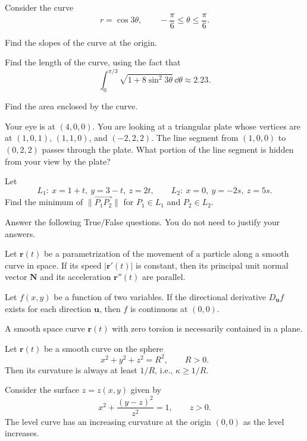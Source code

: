 \begin{problem}
Consider the curve
\[
r=\cos3\theta,
\qquad -\frac{\pi}{6}\le\theta\le\frac{\pi}{6}.
\]
\begin{problemsubparts}
\item Find the slopes of the curve at the origin.
\item Find the length of the curve, using the fact that
\[
\int_0^{\pi/3}\sqrt{1+8\sin^2 3\theta}\,\dd\theta\approx2.23.
\]
\item Find the area enclosed by the curve.
\end{problemsubparts}
\end{problem}

\begin{problem}
Your eye is at $(4,0,0)$. You are looking at a triangular plate whose vertices are at $(1,0,1)$, $(1,1,0)$, and $(-2,2,2)$. The line segment from $(1,0,0)$ to $(0,2,2)$ passes through the plate. What portion of the line segment is hidden from your view by the plate?
\end{problem}

\begin{problem}
Let
\[
L_1:\ x=1+t,\ y=3-t,\ z=2t,
\qquad
L_2:\ x=0,\ y=-2s,\ z=5s.
\]
Find the minimum of $\|\overrightarrow{P_1P_2}\|$ for $P_1\in L_1$ and $P_2\in L_2$.
\end{problem}


\begin{problem}
Answer the following True/False questions. You do not need to justify your answers.
\begin{problemsubparts}
\item Let $\mathbf r(t)$ be a parametrization of the movement of a particle along a smooth curve in space. If its speed $|\mathbf r'(t)|$ is constant, then its principal unit normal vector $\mathbf N$ and its acceleration $\mathbf r''(t)$ are parallel.
\item Let $f(x,y)$ be a function of two variables. If the directional derivative $D_{\mathbf u}f$ exists for each direction $\mathbf u$, then $f$ is continuous at $(0,0)$.
\item A smooth space curve $\mathbf r(t)$ with zero torsion is necessarily contained in a plane.
\item Let $\mathbf r(t)$ be a smooth curve on the sphere
\[
x^2+y^2+z^2=R^2,
\qquad R>0.
\]
Then its curvature is always at least $1/R$, i.e., $\kappa\ge 1/R$.
\item Consider the surface $z=z(x,y)$ given by
\[
x^2+\frac{(y-z)^2}{z^2}=1,
\qquad z>0.
\]
The level curve has an increasing curvature at the origin $(0,0)$ as the level increases.
\end{problemsubparts}
\end{problem}

